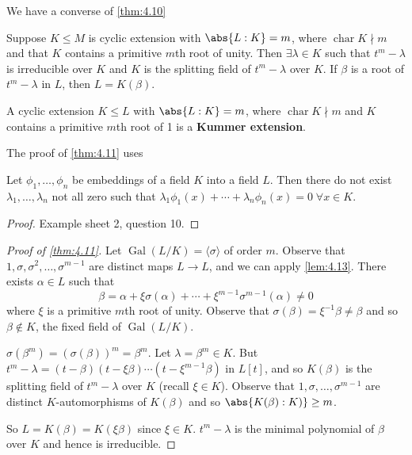 \documentclass{article}
\DeclareMathOperator{\chara}{char}
\DeclareMathOperator{\Gal}{Gal}
\begin{document}
We have a converse of \cref{thm:4.10}
\begin{nthm}\label{thm:4.11}
    Suppose $K \leq M$ is cyclic extension with $\abs{L:K} = m$, where $\chara K \nmid m$ and that $K$ contains a primitive $m$th root of unity.
    Then $\exists \lambda \in K$ such that $t^m - \lambda$ is irreducible over $K$ and $K$ is the splitting field of $t^m - \lambda$ over $K$.
    If $\beta$ is a root of $t^m - \lambda$ in $L$, then $L = K(\beta)$.
\end{nthm}

\begin{ndef}\label{def:4.12}
    A cyclic extension $K \leq L$ with $\abs{L:K} = m$, where $\chara K \nmid m$ and $K$ contains a primitive $m$th root of 1 is a \textbf{Kummer extension}.
\end{ndef}

The proof of \cref{thm:4.11} uses
\begin{nlemma}\label{thm:4.13}
    Let $\phi_1, \dotsc, \phi_n$ be embeddings of a field $K$ into a field $L$.
    Then there do not exist $\lambda_1, \dotsc, \lambda_n$ not all zero such that $\lambda_1 \phi_1(x) + \dotsb + \lambda_n \phi_n(x) = 0 \; \forall x \in K$.
\end{nlemma}

\begin{proof}
    Example sheet 2, question 10.
\end{proof}

\begin{proof}[Proof of \cref{thm:4.11}]
    Let $\Gal(L/K) = \langle \sigma \rangle$ of order $m$.
    Observe that $1, \sigma, \sigma^2, \dotsc, \sigma^{m-1}$ are distinct maps $L \to L$, and we can apply \cref{lem:4.13}.
    There exists $\alpha \in L$ such that
    \begin{equation*}
        \beta = \alpha + \xi \sigma(\alpha) + \dotsb + \xi^{m-1} \sigma^{m-1}(\alpha) \neq 0
    \end{equation*}
    where $\xi$ is a primitive $m$th root of unity.
    Observe that $\sigma(\beta) = \xi^{-1} \beta \neq \beta$ and so $\beta \notin K$, the fixed field of $\Gal(L/K)$.

    $\sigma(\beta^m) = (\sigma(\beta))^m = \beta^m$. Let $\lambda = \beta^m \in K$.
    But $t^m - \lambda = (t-\beta)(t-\xi\beta)\dotsm(t-\xi^{m-1}\beta)$ in $L[t]$, and so $K(\beta)$ is the splitting field of $t^m - \lambda$ over $K$ (recall $\xi \in K$).
    Observe that $1, \sigma, \dotsc, \sigma^{m-1}$ are distinct $K$-automorphisms of $K(\beta)$ and so $\abs{K(\beta):K)} \geq m$.

    So $L = K(\beta) = K(\xi\beta)$ since $\xi \in K$.
    $t^m - \lambda$ is the minimal polynomial of $\beta$ over $K$ and hence is irreducible.
\end{proof}
\end{document}
